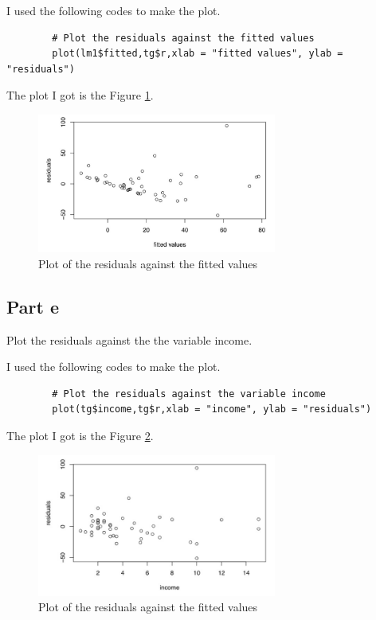 \begin{answer}
    I used the following codes to make the plot.
    \begin{verbatim}
        # Plot the residuals against the fitted values
        plot(lm1$fitted,tg$r,xlab = "fitted values", ylab = "residuals")
    \end{verbatim}
    The plot I got is the Figure \ref{fig:fig6}.
    \begin{figure}[H]
        \centering
        \includegraphics[width=0.7\textwidth]{Figure 6.jpeg}
        \caption{\label{fig:fig6}Plot of the residuals against the fitted values}
    \end{figure}
\end{answer}

\subsection{Part e}

\begin{question}
    Plot the residuals against the the variable income.
\end{question}

\begin{answer}
    I used the following codes to make the plot.
    \begin{verbatim}
        # Plot the residuals against the variable income
        plot(tg$income,tg$r,xlab = "income", ylab = "residuals")
    \end{verbatim}
    The plot I got is the Figure \ref{fig:fig7}.
    \begin{figure}[H]
        \centering
        \includegraphics[width=0.7\textwidth]{Figure 7.jpeg}
        \caption{\label{fig:fig7}Plot of the residuals against the fitted values}
    \end{figure}
\end{answer}

